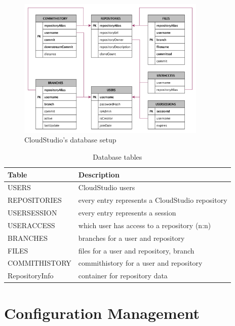 \begin{figure}[h!]
  \centering
      \includegraphics[width=0.8\textwidth]{databasegraph}
  \caption{CloudStudio's database setup}
  \label{fig:databasegraph}
\end{figure}



\begin{table}

    \scriptsize
    \begin{tabularx}{\textwidth}{ | l | X | }
    \hline
\textbf{Table} & \textbf{Description} \\ \hline
USERS & CloudStudio users \\ \hline
REPOSITORIES & every entry represents a CloudStudio repository \\ \hline
USERSESSION & every entry represents a session \\ \hline
USERACCESS & which user has access to a repository (n:n) \\ \hline
BRANCHES & branches for a user and repository \\ \hline
FILES & files for a user and repository, branch \\ \hline
COMMITHISTORY & commithistory for a user and repository \\ \hline
RepositoryInfo & container for repository data \\ \hline
    \end{tabularx}
    
    \centering
  \caption{Database tables}
  \label{table:databasetables}
\end{table}



\section{Configuration Management}\label{configmanagement}

